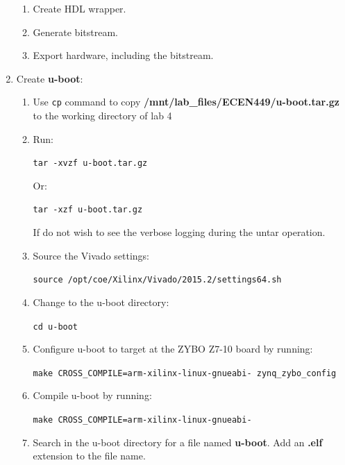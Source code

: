 \documentclass[11pt,letterpaper,titlepage]{article}
\begin{document}
\begin{enumerate}
\begin{enumerate}
        \item Create HDL wrapper.
        
        \item Generate bitstream.
        
        \item Export hardware, including the bitstream.
        
    \end{enumerate}
    
    \item Create \textbf{u-boot}:
    
    \begin{enumerate}
        
        \item Use \verb|cp| command to copy \textbf{/mnt/lab\_files/ECEN449/u-boot.tar.gz} to the working directory of lab 4
        
        \item Run:
        
        \verb|tar -xvzf u-boot.tar.gz|
        
        Or:
        
        \verb|tar -xzf u-boot.tar.gz|
        
        If do not wish to see the verbose logging during the untar operation.
        
        \item Source the Vivado settings:
        
        \verb|source /opt/coe/Xilinx/Vivado/2015.2/settings64.sh|
        
        \item Change to the u-boot directory:
        
        \verb|cd u-boot|
        
        \item Configure u-boot to target at the ZYBO Z7-10 board by running:
        
        \verb|make CROSS_COMPILE=arm-xilinx-linux-gnueabi- zynq_zybo_config|
        
        \item Compile u-boot by running:
        
        \verb|make CROSS_COMPILE=arm-xilinx-linux-gnueabi-|
        
        \item Search in the u-boot directory for a file named \textbf{u-boot}. Add an \textbf{.elf} extension to the file name.
        

\end{enumerate}
\end{enumerate}
\end{document}
